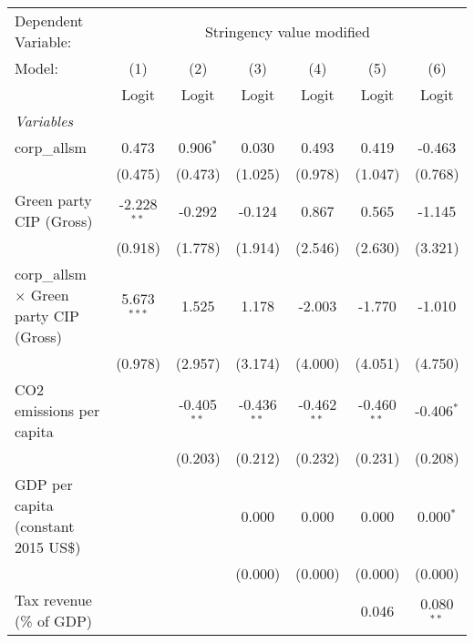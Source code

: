
\begingroup
\centering
\begin{tabular}{lcccccc}
   \toprule
   Dependent Variable: & \multicolumn{6}{c}{Stringency value modified}\\
   Model:                                         & (1)           & (2)           & (3)           & (4)           & (5)           & (6)\\  
                                                  &  Logit        & Logit         & Logit         & Logit         & Logit         & Logit\\  
   \midrule
   \emph{Variables}\\
   corp\_allsm                                    & 0.473         & 0.906$^{*}$   & 0.030         & 0.493         & 0.419         & -0.463\\   
                                                  & (0.475)       & (0.473)       & (1.025)       & (0.978)       & (1.047)       & (0.768)\\   
   Green party CIP (Gross)                        & -2.228$^{**}$ & -0.292        & -0.124        & 0.867         & 0.565         & -1.145\\   
                                                  & (0.918)       & (1.778)       & (1.914)       & (2.546)       & (2.630)       & (3.321)\\   
   corp\_allsm $\times$ Green party CIP (Gross)   & 5.673$^{***}$ & 1.525         & 1.178         & -2.003        & -1.770        & -1.010\\   
                                                  & (0.978)       & (2.957)       & (3.174)       & (4.000)       & (4.051)       & (4.750)\\   
   CO2 emissions per capita                       &               & -0.405$^{**}$ & -0.436$^{**}$ & -0.462$^{**}$ & -0.460$^{**}$ & -0.406$^{*}$\\   
                                                  &               & (0.203)       & (0.212)       & (0.232)       & (0.231)       & (0.208)\\   
   GDP per capita (constant 2015 US\$)            &               &               & 0.000         & 0.000         & 0.000         & 0.000$^{*}$\\   
                                                  &               &               & (0.000)       & (0.000)       & (0.000)       & (0.000)\\   
   Tax revenue (\% of GDP)                        &               &               &               &               & 0.046         & 0.080$^{**}$\\   

\end{tabular}
